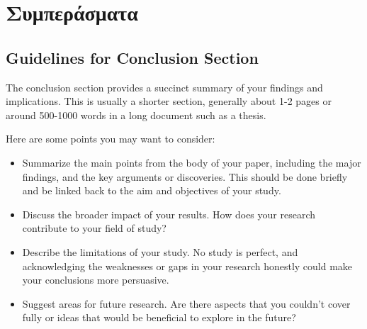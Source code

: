 \chapter{Συμπεράσματα}

\section*{Guidelines for Conclusion Section}
The conclusion section provides a succinct summary of your findings and implications. This is usually a shorter section, generally about 1-2 pages or around 500-1000 words in a long document such as a thesis. 

Here are some points you may want to consider:
\begin{itemize}
    \item Summarize the main points from the body of your paper, including the major findings, and the key arguments or discoveries. This should be done briefly and be linked back to the aim and objectives of your study.
    \item Discuss the broader impact of your results. How does your research contribute to your field of study? 
    \item Describe the limitations of your study. No study is perfect, and acknowledging the weaknesses or gaps in your research honestly could make your conclusions more persuasive.
    \item Suggest areas for future research. Are there aspects that you couldn't cover fully or ideas that would be beneficial to explore in the future?
\end{itemize}